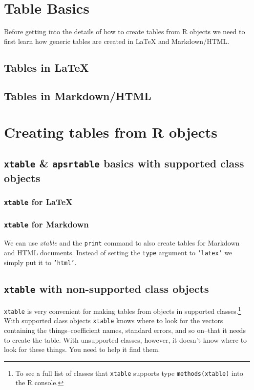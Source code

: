 \section{Table Basics}

Before getting into the details of how to create tables from R objects we need to first learn how generic tables are created in LaTeX and Markdown/HTML.

\subsection{Tables in LaTeX}


\subsection{Tables in Markdown/HTML}

\section{Creating tables from R objects}

\subsection{\texttt{xtable} \& \texttt{apsrtable} basics with supported
class objects}

\subsubsection{\texttt{xtable} for LaTeX}

\subsubsection{\texttt{xtable} for Markdown}

We can use {\emph{xtable}} and the \texttt{print} command to also create tables for Markdown and HTML documents. Instead of setting the \texttt{type} argument to \texttt{`latex`} we simply put it to \texttt{'html'}.


\subsection{\texttt{xtable} with non-supported class objects}

{\tt{xtable}} is very convenient for making tables from objects in supported classes.\footnote{To see a full list of classes that {\tt{xtable}} supports type \texttt{methods(xtable)} into the R console.} With supported class objects {\tt{xtable}} knows where to look for the vectors containing the things--coefficient names, standard errors, and so on--that it needs to create the table. With unsupported classes, however, it doesn't know where to look for these things. You need to help it find them. 

